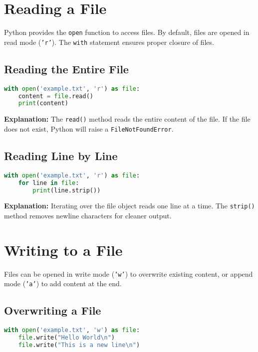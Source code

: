 \section{Reading a File}

Python provides the \texttt{open} function to access files. By default, files are opened in read mode (\texttt{'r'}). The \texttt{with} statement ensures proper closure of files.

\subsection{Reading the Entire File}

\begin{lstlisting}[language=Python]
with open('example.txt', 'r') as file:
    content = file.read()
    print(content)
\end{lstlisting}

\textbf{Explanation:} The \texttt{read()} method reads the entire content of the file. If the file does not exist, Python will raise a \texttt{FileNotFoundError}.  

\subsection{Reading Line by Line}

\begin{lstlisting}[language=Python]
with open('example.txt', 'r') as file:
    for line in file:
        print(line.strip())
\end{lstlisting}

\textbf{Explanation:} Iterating over the file object reads one line at a time. The \texttt{strip()} method removes newline characters for cleaner output.

\section{Writing to a File}

Files can be opened in write mode (\texttt{'w'}) to overwrite existing content, or append mode (\texttt{'a'}) to add content at the end.

\subsection{Overwriting a File}

\begin{lstlisting}[language=Python]
with open('example.txt', 'w') as file:
    file.write("Hello World\n")
    file.write("This is a new line\n")
\end{lstlisting}

